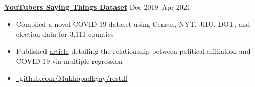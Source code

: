 \textbf{\href{https://github.com/petezh/COVID-Analysis}{YouTubers Saying Things Dataset}} \hfill Dec 2019--Apr 2021 \par
\begin{itemize}
	\item Compiled a novel COVID-19 dataset using Census, NYT, JHU, DOT, and election data for 3,111 counties
	\item Published \href{https://econreview.berkeley.edu/partisanship-and-covid-19-response/}{article} detailing the relationship between political affiliation and COVID-19 via multiple regression
\end{itemize}

\begin{itemize}
	\item[] \href{https://github.com/Mukhopadhyay/restdf}{\github\ github.com/Mukhopadhyay/restdf}
\end{itemize}

\vspace{0.1cm}\par